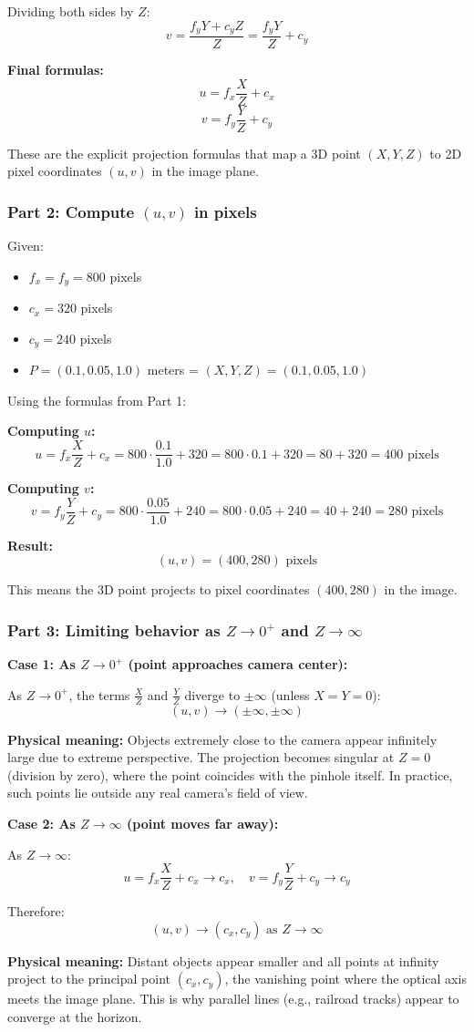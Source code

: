 \documentclass[11pt]{article}
\begin{document}
Dividing both sides by $Z$:
\[
v = \frac{f_y Y + c_y Z}{Z} = \frac{f_y Y}{Z} + c_y
\]

\textbf{Final formulas:}
\[
\boxed{u = f_x \frac{X}{Z} + c_x}
\]
\[
\boxed{v = f_y \frac{Y}{Z} + c_y}
\]

These are the explicit projection formulas that map a 3D point $(X, Y, Z)$ to 2D pixel coordinates $(u, v)$ in the image plane.

\subsubsection*{Part 2: Compute $(u, v)$ in pixels}

Given:
\begin{itemize}
    \item $f_x = f_y = 800$ pixels
    \item $c_x = 320$ pixels
    \item $c_y = 240$ pixels
    \item $P = (0.1, 0.05, 1.0)$ meters = $(X, Y, Z) = (0.1, 0.05, 1.0)$
\end{itemize}

Using the formulas from Part 1:

\textbf{Computing $u$:}
\[
u = f_x \frac{X}{Z} + c_x = 800 \cdot \frac{0.1}{1.0} + 320 = 800 \cdot 0.1 + 320 = 80 + 320 = 400 \text{ pixels}
\]

\textbf{Computing $v$:}
\[
v = f_y \frac{Y}{Z} + c_y = 800 \cdot \frac{0.05}{1.0} + 240 = 800 \cdot 0.05 + 240 = 40 + 240 = 280 \text{ pixels}
\]

\textbf{Result:}
\[
\boxed{(u, v) = (400, 280) \text{ pixels}}
\]

This means the 3D point projects to pixel coordinates $(400, 280)$ in the image.

\subsubsection*{Part 3: Limiting behavior as $Z \to 0^+$ and $Z \to \infty$}

\textbf{Case 1: As $Z \to 0^+$ (point approaches camera center):}

As $Z \to 0^+$, the terms $\frac{X}{Z}$ and $\frac{Y}{Z}$ diverge to $\pm\infty$ (unless $X = Y = 0$):
\[
(u, v) \to (\pm\infty, \pm\infty)
\]

\textbf{Physical meaning:} Objects extremely close to the camera appear infinitely large due to extreme perspective. The projection becomes singular at $Z = 0$ (division by zero), where the point coincides with the pinhole itself. In practice, such points lie outside any real camera's field of view.

\textbf{Case 2: As $Z \to \infty$ (point moves far away):}

As $Z \to \infty$:
\[
u = f_x \frac{X}{Z} + c_x \to c_x, \quad v = f_y \frac{Y}{Z} + c_y \to c_y
\]

Therefore:
\[
\boxed{(u, v) \to (c_x, c_y) \text{ as } Z \to \infty}
\]

\textbf{Physical meaning:} Distant objects appear smaller and all points at infinity project to the principal point $(c_x, c_y)$, the vanishing point where the optical axis meets the image plane. This is why parallel lines (e.g., railroad tracks) appear to converge at the horizon.
\end{document}
